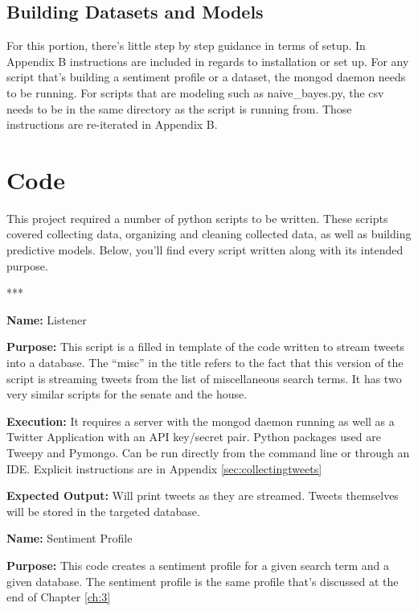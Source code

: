 \documentclass[11pt, twoside, reqno]{book}
\begin{document}
\begin{appendices}
\section{Building Datasets and Models}
\hspace{0.2in} For this portion, there's little step by step guidance in terms of setup. In Appendix B instructions are included in regards to installation or set up. For any script that's building a sentiment profile or a dataset, the mongod daemon needs to be running. For scripts that are modeling such as naive\_bayes.py, the csv needs to be in the same directory as the script is running from. Those instructions are re-iterated in Appendix B. 

\chapter{Code}
This project required a number of python scripts to be written. These scripts covered collecting data, organizing and cleaning collected data, as well as building predictive models. Below, you'll find every script written along with its intended purpose.

\centerline{***}

\textbf{Name:} Listener

\textbf{Purpose:} This script is a filled in template of the code written to stream tweets into a database. The ``misc'' in the title refers to the fact that this version of the script is streaming tweets from the list of miscellaneous search terms. It has two very similar scripts for the senate and the house. 

\textbf{Execution:} It requires a server with the mongod daemon running as well as a Twitter Application with an API key/secret pair. Python packages used are Tweepy and Pymongo. Can be run directly from the command line or through an IDE. Explicit instructions are in Appendix \ref{sec:collectingtweets} 

\textbf{Expected Output:} Will print tweets as they are streamed. Tweets themselves will be stored in the targeted database. 



\newpage

\textbf{Name:} Sentiment Profile

\textbf{Purpose:} This code creates a sentiment profile for a given search term and a given database. The sentiment profile is the same profile that's discussed at the end of Chapter \ref{ch:3}


\end{appendices}
\end{document}
